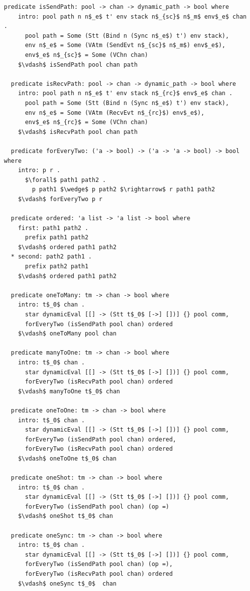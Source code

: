 \documentclass[letterpaper, 11pt]{report}
\begin{document}
\begin{lstlisting}[language=logic, mathescape]
  predicate isSendPath: pool -> chan -> dynamic_path -> bool where
    intro: pool path n n$_e$ t' env stack n$_{sc}$ n$_m$ env$_e$ chan .
      pool path = Some (Stt (Bind n (Sync n$_e$) t') env stack),
      env n$_e$ = Some (VAtm (SendEvt n$_{sc}$ n$_m$) env$_e$), 
      env$_e$ n$_{sc}$ = Some (VChn chan)
    $\vdash$ isSendPath pool chan path

  predicate isRecvPath: pool -> chan -> dynamic_path -> bool where
    intro: pool path n n$_e$ t' env stack n$_{rc}$ env$_e$ chan .
      pool path = Some (Stt (Bind n (Sync n$_e$) t') env stack),
      env n$_e$ = Some (VAtm (RecvEvt n$_{rc}$) env$_e$),
      env$_e$ n$_{rc}$ = Some (VChn chan)
    $\vdash$ isRecvPath pool chan path

  predicate forEveryTwo: ('a -> bool) -> ('a -> 'a -> bool) -> bool where
    intro: p r .
      $\forall$ path1 path2 .
        p path1 $\wedge$ p path2 $\rightarrow$ r path1 path2
    $\vdash$ forEveryTwo p r

  predicate ordered: 'a list -> 'a list -> bool where
    first: path1 path2 .
      prefix path1 path2
    $\vdash$ ordered path1 path2
  * second: path2 path1 .
      prefix path2 path1
    $\vdash$ ordered path1 path2

  predicate oneToMany: tm -> chan -> bool where
    intro: t$_0$ chan .
      star dynamicEval [[] -> (Stt t$_0$ [->] [])] {} pool comm,
      forEveryTwo (isSendPath pool chan) ordered
    $\vdash$ oneToMany pool chan

  predicate manyToOne: tm -> chan -> bool where
    intro: t$_0$ chan .
      star dynamicEval [[] -> (Stt t$_0$ [->] [])] {} pool comm,
      forEveryTwo (isRecvPath pool chan) ordered
    $\vdash$ manyToOne t$_0$ chan

  predicate oneToOne: tm -> chan -> bool where
    intro: t$_0$ chan .
      star dynamicEval [[] -> (Stt t$_0$ [->] [])] {} pool comm,
      forEveryTwo (isSendPath pool chan) ordered,
      forEveryTwo (isRecvPath pool chan) ordered
    $\vdash$ oneToOne t$_0$ chan

  predicate oneShot: tm -> chan -> bool where
    intro: t$_0$ chan .
      star dynamicEval [[] -> (Stt t$_0$ [->] [])] {} pool comm,
      forEveryTwo (isSendPath pool chan) (op =)
    $\vdash$ oneShot t$_0$ chan

  predicate oneSync: tm -> chan -> bool where
    intro: t$_0$ chan .
      star dynamicEval [[] -> (Stt t$_0$ [->] [])] {} pool comm,
      forEveryTwo (isSendPath pool chan) (op =),
      forEveryTwo (isRecvPath pool chan) ordered 
    $\vdash$ oneSync t$_0$  chan

\end{lstlisting}
\end{document}
